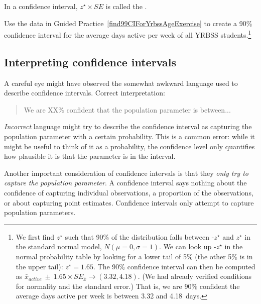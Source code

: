 \begin{termBox}{
\label{marginOfErrorTermBox}In a confidence interval, $z^{\star}\times SE$ is called the .}
\end{termBox}

\textC{\newpage}

\begin{exercise} \label{find90CIForYrbssAgeExercise}
Use the data in Guided Practice~\ref{find99CIForYrbssAgeExercise} to create a 90\% confidence interval for the average days active per week of all YRBSS students.\footnote{We first find $z^{\star}$ such that 90\% of the distribution falls between -$z^{\star}$ and $z^{\star}$ in the standard normal model, $N(\mu=0, \sigma=1)$. We can look up -$z^{\star}$ in the normal probability table by looking for a lower tail of 5\% (the other 5\% is in the upper tail): $z^{\star}=1.65$. The 90\% confidence interval can then be computed as $\bar{x}_{active}\ \pm\ 1.65\times SE_{\bar{x}} \to (3.32, 4.18)$. (We had already verified conditions for normality and the standard error.) That is, we are 90\% confident the average days active per week is between 3.32 and 4.18~days.}
\end{exercise}

\subsection{Interpreting confidence intervals}
\label{interpretingCIs}


A careful eye might have observed the somewhat awkward language used to describe confidence intervals. Correct interpretation:
\begin{quote}
We are XX\% confident that the population parameter is between...
\end{quote}
\emph{Incorrect} language might try to describe the confidence interval as capturing the population parameter with a certain probability. This is a common error: while it might be useful to think of it as a probability, the confidence level only quantifies how plausible it is that the parameter is in the interval.

Another important consideration of confidence intervals is that they \emph{only try to capture the population parameter}. A confidence interval says nothing about the confidence of capturing individual observations, a proportion of the observations, or about capturing point estimates. Confidence intervals only attempt to capture population parameters.

